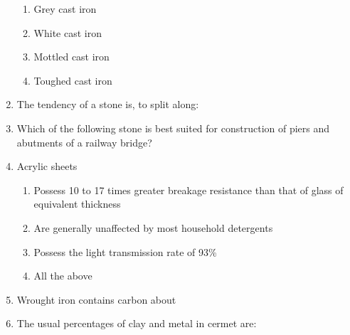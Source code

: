 \documentclass[11pt,a4paper]{article}
\begin{document}
\begin{enumerate}
\begin{enumerate}[label=\Alph*.]
\item{Grey cast iron}
\item{White cast iron}
\item{Mottled cast iron}
\item{Toughed cast iron}
\end{enumerate}
\item{The tendency of a stone is, to split along:}
\\
\item{Which of the following stone is best suited for construction of piers and abutments of a railway bridge?}
\\
\item{Acrylic sheets}
\begin{enumerate}[label=\Alph*.]
\item{Possess 10 to 17 times greater breakage resistance than that of glass of equivalent thickness}
\item{Are generally unaffected by most household detergents}
\item{Possess the light transmission rate of 93\%}
\item{All the above}
\end{enumerate}
\item{Wrought iron contains carbon about}
\\
\item{The usual percentages of clay and metal in cermet are:}

\end{enumerate}
\end{document}
